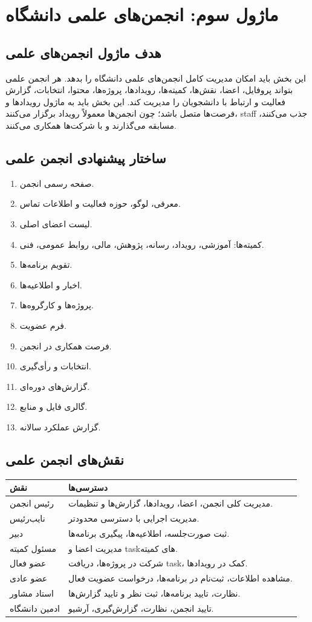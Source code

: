 \documentclass[12pt,a4paper]{article}
\begin{document}
\section{ماژول سوم: انجمن‌های علمی دانشگاه}

\subsection{هدف ماژول انجمن‌های علمی}
این بخش باید امکان مدیریت کامل انجمن‌های علمی دانشگاه را بدهد. هر انجمن علمی بتواند پروفایل، اعضا، نقش‌ها، کمیته‌ها، رویدادها، پروژه‌ها، محتوا، انتخابات، گزارش فعالیت و ارتباط با دانشجویان را مدیریت کند. این بخش باید به ماژول رویدادها و فرصت‌ها متصل باشد؛ چون انجمن‌ها معمولاً رویداد برگزار می‌کنند، staff جذب می‌کنند، مسابقه می‌گذارند و با شرکت‌ها همکاری می‌کنند.

\subsection{ساختار پیشنهادی انجمن علمی}
\begin{enumerate}
\item صفحه رسمی انجمن.
\item معرفی، لوگو، حوزه فعالیت و اطلاعات تماس.
\item لیست اعضای اصلی.
\item کمیته‌ها: آموزشی، رویداد، رسانه، پژوهش، مالی، روابط عمومی، فنی.
\item تقویم برنامه‌ها.
\item اخبار و اطلاعیه‌ها.
\item پروژه‌ها و کارگروه‌ها.
\item فرم عضویت.
\item فرصت همکاری در انجمن.
\item انتخابات و رأی‌گیری.
\item گزارش‌های دوره‌ای.
\item گالری فایل و منابع.
\item گزارش عملکرد سالانه.
\end{enumerate}

\subsection{نقش‌های انجمن علمی}
\begin{longtable}{p{}p{}}
\toprule
\textbf{نقش} & \textbf{دسترسی‌ها}\\
\midrule
رئیس انجمن & مدیریت کلی انجمن، اعضا، رویدادها، گزارش‌ها و تنظیمات.\\
نایب‌رئیس & مدیریت اجرایی با دسترسی محدودتر.\\
دبیر & ثبت صورت‌جلسه، اطلاعیه‌ها، پیگیری برنامه‌ها.\\
مسئول کمیته & مدیریت اعضا و taskهای کمیته.\\
عضو فعال & شرکت در پروژه‌ها، دریافت task، کمک در رویدادها.\\
عضو عادی & مشاهده اطلاعات، ثبت‌نام در برنامه‌ها، درخواست عضویت فعال.\\
استاد مشاور & نظارت، تایید برنامه‌ها، ثبت نظر و تایید گزارش‌ها.\\
ادمین دانشگاه & تایید انجمن، نظارت، گزارش‌گیری، آرشیو.\\
\bottomrule
\end{longtable}
\end{document}
